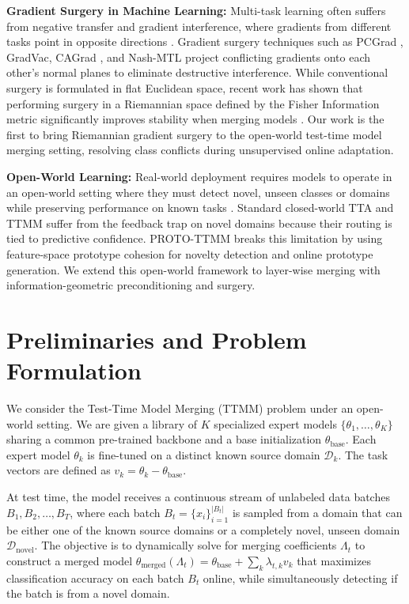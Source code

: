 \documentclass{article}
\theoremstyle{plain}
\theoremstyle{definition}
\theoremstyle{remark}
\begin{document}
\textbf{Gradient Surgery in Machine Learning:} Multi-task learning often suffers from negative transfer and gradient interference, where gradients from different tasks point in opposite directions \cite{sener18}. Gradient surgery techniques such as PCGrad \cite{yu20}, GradVac, CAGrad \cite{liu21}, and Nash-MTL project conflicting gradients onto each other's normal planes to eliminate destructive interference. While conventional surgery is formulated in flat Euclidean space, recent work has shown that performing surgery in a Riemannian space defined by the Fisher Information metric significantly improves stability when merging models \cite{authors26a}. Our work is the first to bring Riemannian gradient surgery to the open-world test-time model merging setting, resolving class conflicts during unsupervised online adaptation.

\textbf{Open-World Learning:} Real-world deployment requires models to operate in an open-world setting where they must detect novel, unseen classes or domains while preserving performance on known tasks \cite{bendale16, kirkpatrick17, lopezpaz17}. Standard closed-world TTA and TTMM suffer from the feedback trap on novel domains because their routing is tied to predictive confidence. PROTO-TTMM \cite{authors26b} breaks this limitation by using feature-space prototype cohesion for novelty detection and online prototype generation. We extend this open-world framework to layer-wise merging with information-geometric preconditioning and surgery.

\section{Preliminaries and Problem Formulation}
\label{sec:prelim}
We consider the Test-Time Model Merging (TTMM) problem under an open-world setting. We are given a library of $K$ specialized expert models $\{\theta_1, \dots, \theta_K\}$ sharing a common pre-trained backbone and a base initialization $\theta_{\text{base}}$. Each expert model $\theta_k$ is fine-tuned on a distinct known source domain $\mathcal{D}_k$. The task vectors are defined as $v_k = \theta_k - \theta_{\text{base}}$.

At test time, the model receives a continuous stream of unlabeled data batches $B_1, B_2, \dots, B_T$, where each batch $B_t = \{x_i\}_{i=1}^{|B_t|}$ is sampled from a domain that can be either one of the known source domains or a completely novel, unseen domain $\mathcal{D}_{\text{novel}}$. The objective is to dynamically solve for merging coefficients $\Lambda_t$ to construct a merged model $\theta_{\text{merged}}(\Lambda_t) = \theta_{\text{base}} + \sum_k \lambda_{t,k} v_k$ that maximizes classification accuracy on each batch $B_t$ online, while simultaneously detecting if the batch is from a novel domain.
\end{document}

